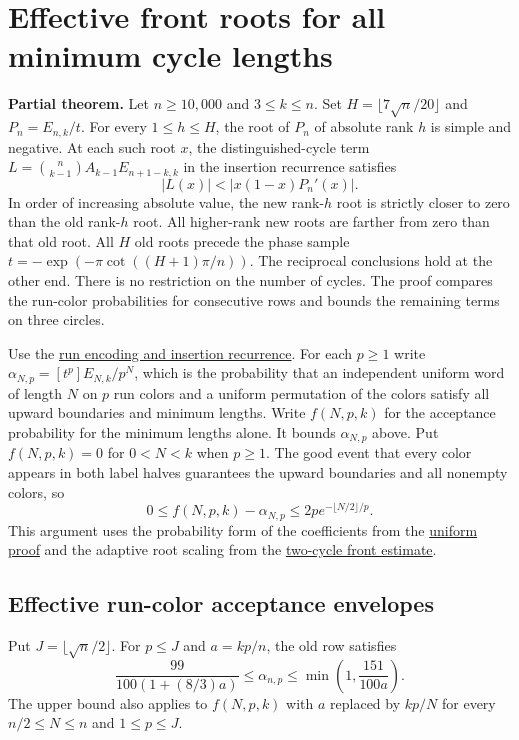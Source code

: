 \section{Effective front roots for all minimum cycle lengths}

\textbf{Partial theorem.} Let $n\ge10{,}000$ and $3\le k\le n$. Set $H=\lfloor7\sqrt n/20\rfloor$ and $P_n=E_{n,k}/t$. For every $1\le h\le H$, the root of $P_n$ of absolute rank $h$ is simple and negative. At each such root $x$, the distinguished-cycle term $L=\binom n{k-1}A_{k-1}E_{n+1-k,k}$ in the insertion recurrence satisfies
\[
|L(x)|<|x(1-x)P_n'(x)|.
\]
In order of increasing absolute value, the new rank-$h$ root is strictly closer to zero than the old rank-$h$ root. All higher-rank new roots are farther from zero than that old root. All $H$ old roots precede the phase sample $t=-\exp(-\pi\cot((H+1)\pi/n))$. The reciprocal conclusions hold at the other end. There is no restriction on the number of cycles. The proof compares the run-color probabilities for consecutive rows and bounds the remaining terms on three circles.

Use the \href{https://github.com/ProgramComputer/open-math-research/blob/main/topics/long-cycle-excedances/proof.md}{run encoding and insertion recurrence}. For each $p\ge1$ write $\alpha_{N,p}=[t^p]E_{N,k}/p^N$, which is the probability that an independent uniform word of length $N$ on $p$ run colors and a uniform permutation of the colors satisfy all upward boundaries and minimum lengths. Write $f(N,p,k)$ for the acceptance probability for the minimum lengths alone. It bounds $\alpha_{N,p}$ above. Put $f(N,p,k)=0$ for $0<N<k$ when $p\ge1$. The good event that every color appears in both label halves guarantees the upward boundaries and all nonempty colors, so
\[
0\le f(N,p,k)-\alpha_{N,p}\le 2p e^{-\lfloor N/2\rfloor/p}.
\tag{F1}
\]
This argument uses the probability form of the coefficients from the \href{https://github.com/ProgramComputer/open-math-research/blob/main/topics/long-cycle-excedances/uniform-interlacing.md}{uniform proof} and the adaptive root scaling from the \href{https://github.com/ProgramComputer/open-math-research/blob/main/topics/long-cycle-excedances/two-cycle-front.md}{two-cycle front estimate}.

\subsection{Effective run-color acceptance envelopes}

Put $J=\lfloor\sqrt n/2\rfloor$. For $p\le J$ and $a=kp/n$, the old row satisfies
\[
\frac{99}{100(1+(8/3)a)}\le\alpha_{n,p}\le
\min\left(1,\frac{151}{100a}\right).
\tag{F2}
\]
The upper bound also applies to $f(N,p,k)$ with $a$ replaced by $kp/N$ for every $n/2\le N\le n$ and $1\le p\le J$.

